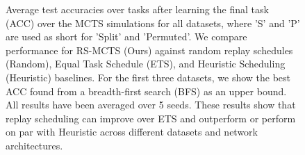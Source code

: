 

\begin{figure}[t]
  \centering
  \setlength{\figwidth}{0.23\textwidth}
  \setlength{\figheight}{.13\textheight}
  
  \vspace{-3mm}
  \caption{ Average test accuracies over tasks after learning the final task (ACC) over the MCTS simulations for all datasets, where 'S' and 'P' are used as short for 'Split' and 'Permuted'. We compare performance for RS-MCTS (Ours) against random replay schedules (Random), Equal Task Schedule (ETS), and Heuristic Scheduling (Heuristic) baselines. 
  For the first three datasets, we show the best ACC found from a breadth-first search (BFS) as an upper bound. All results have been averaged over 5 seeds. These results show that replay scheduling can improve over ETS and outperform or perform on par with Heuristic across different datasets and network architectures. 
  }
  \label{fig:mcts_best_rewards}
  \vspace{-3mm}
\end{figure}

